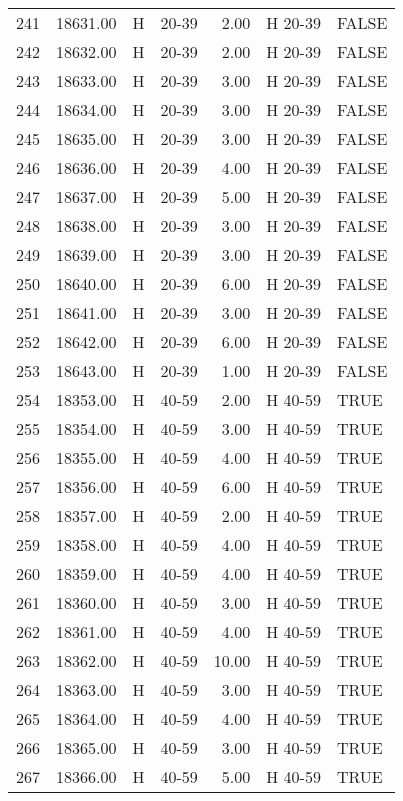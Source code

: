 \begin{table}[ht]
\begin{tabular}{rrllrll}
  241 & 18631.00 & H & 20-39 & 2.00 & H 20-39 & FALSE \\ 
  242 & 18632.00 & H & 20-39 & 2.00 & H 20-39 & FALSE \\ 
  243 & 18633.00 & H & 20-39 & 3.00 & H 20-39 & FALSE \\ 
  244 & 18634.00 & H & 20-39 & 3.00 & H 20-39 & FALSE \\ 
  245 & 18635.00 & H & 20-39 & 3.00 & H 20-39 & FALSE \\ 
  246 & 18636.00 & H & 20-39 & 4.00 & H 20-39 & FALSE \\ 
  247 & 18637.00 & H & 20-39 & 5.00 & H 20-39 & FALSE \\ 
  248 & 18638.00 & H & 20-39 & 3.00 & H 20-39 & FALSE \\ 
  249 & 18639.00 & H & 20-39 & 3.00 & H 20-39 & FALSE \\ 
  250 & 18640.00 & H & 20-39 & 6.00 & H 20-39 & FALSE \\ 
  251 & 18641.00 & H & 20-39 & 3.00 & H 20-39 & FALSE \\ 
  252 & 18642.00 & H & 20-39 & 6.00 & H 20-39 & FALSE \\ 
  253 & 18643.00 & H & 20-39 & 1.00 & H 20-39 & FALSE \\ 
  254 & 18353.00 & H & 40-59 & 2.00 & H 40-59 & TRUE \\ 
  255 & 18354.00 & H & 40-59 & 3.00 & H 40-59 & TRUE \\ 
  256 & 18355.00 & H & 40-59 & 4.00 & H 40-59 & TRUE \\ 
  257 & 18356.00 & H & 40-59 & 6.00 & H 40-59 & TRUE \\ 
  258 & 18357.00 & H & 40-59 & 2.00 & H 40-59 & TRUE \\ 
  259 & 18358.00 & H & 40-59 & 4.00 & H 40-59 & TRUE \\ 
  260 & 18359.00 & H & 40-59 & 4.00 & H 40-59 & TRUE \\ 
  261 & 18360.00 & H & 40-59 & 3.00 & H 40-59 & TRUE \\ 
  262 & 18361.00 & H & 40-59 & 4.00 & H 40-59 & TRUE \\ 
  263 & 18362.00 & H & 40-59 & 10.00 & H 40-59 & TRUE \\ 
  264 & 18363.00 & H & 40-59 & 3.00 & H 40-59 & TRUE \\ 
  265 & 18364.00 & H & 40-59 & 4.00 & H 40-59 & TRUE \\ 
  266 & 18365.00 & H & 40-59 & 3.00 & H 40-59 & TRUE \\ 
  267 & 18366.00 & H & 40-59 & 5.00 & H 40-59 & TRUE \\ 

\end{tabular}
\end{table}
